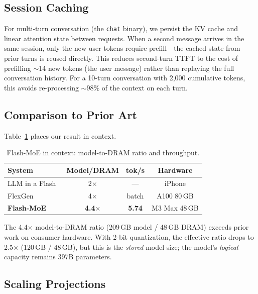 \documentclass[11pt,twocolumn]{article}
\begin{document}
\subsection{Session Caching}
\label{sec:session_cache}

For multi-turn conversation (the \texttt{chat} binary), we persist the KV cache and linear attention state between requests.
When a second message arrives in the same session, only the new user tokens require prefill---the cached state from prior turns is reused directly.
This reduces second-turn TTFT to the cost of prefilling $\sim$14 new tokens (the user message) rather than replaying the full conversation history.
For a 10-turn conversation with 2{,}000 cumulative tokens, this avoids re-processing $\sim$98\% of the context on each turn.

\subsection{Comparison to Prior Art}

Table~\ref{tab:comparison} places our result in context.

\begin{table}[t]
\centering
\small
\caption{Flash-MoE in context: model-to-DRAM ratio and throughput.}
\label{tab:comparison}
\begin{tabular}{@{}lccc@{}}
\toprule
\textbf{System} & \textbf{Model/DRAM} & \textbf{tok/s} & \textbf{Hardware} \\
\midrule
LLM in a Flash~\cite{alizadeh2023llm} & 2$\times$ & --- & iPhone \\
FlexGen~\cite{sheng2023flexgen} & 4$\times$ & batch & A100 80\,GB \\
\textbf{Flash-MoE} & \textbf{4.4$\times$} & \textbf{5.74} & M3 Max 48\,GB \\
\bottomrule
\end{tabular}
\end{table}

The 4.4$\times$ model-to-DRAM ratio (209\,GB model / 48\,GB DRAM) exceeds prior work on consumer hardware.
With 2-bit quantization, the effective ratio drops to 2.5$\times$ (120\,GB / 48\,GB), but this is the \emph{stored} model size; the model's \emph{logical} capacity remains 397B parameters.

\subsection{Scaling Projections}
\end{document}
